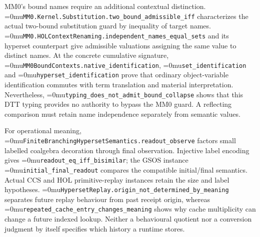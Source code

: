 \documentclass[11pt]{article}
\newcommand{\leanname}[1]{\textup{\Urlmuskip=0mu\relax\nolinkurl{#1}}}
\theoremstyle{definition}
\theoremstyle{remark}
\begin{document}
MM0's bound names require an additional contextual distinction.
\leanname{MM0.Kernel.Substitution.two_bound_admissible_iff} characterizes the
actual two-bound substitution guard by inequality of target names.
\leanname{MM0.HOLContextRenaming.independent_names_equal_sets} and its
hyperset counterpart give admissible valuations assigning the same value to
distinct names. At the concrete cumulative signature,
\leanname{MM0BoundContexts.native_identification}, \leanname{set_identification}
and \leanname{hyperset_identification} prove that ordinary object-variable
identification commutes with term translation and material interpretation.
Nevertheless, \leanname{typing_does_not_admit_bound_collapse} shows that this
DTT typing provides no authority to bypass the MM0 guard. A reflecting
comparison must retain name independence separately from semantic values.

For operational meaning, \leanname{FiniteBranchingHypersetSemantics.readout_observe}
factors small labelled coalgebra decoration through final observation.
Injective label encoding gives \leanname{readout_eq_iff_bisimilar}; the GSOS
instance \leanname{initial_final_readout} compares the compatible initial/final
semantics. Actual CCS and HOL primitive-replay instances retain the size and
label hypotheses. \leanname{HypersetReplay.origin_not_determined_by_meaning}
separates future replay behaviour from past receipt origin, whereas
\leanname{repeated_cache_entry_changes_meaning} shows why cache multiplicity
can change a future indexed lookup. Neither a behavioural quotient nor a
conversion judgment by itself specifies which history a runtime stores.
\end{document}
